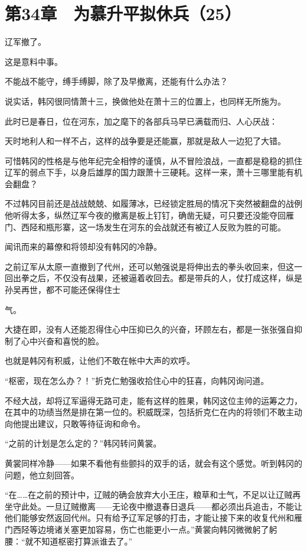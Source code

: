 \section{第34章　为慕升平拟休兵（25）}

辽军撤了。

这是意料中事。

不能战不能守，缚手缚脚，除了及早撤离，还能有什么办法？

说实话，韩冈很同情萧十三，换做他处在萧十三的位置上，也同样无所施为。

此时已是春日，位在河东，加之麾下的各部兵马早已满载而归、人心厌战：

天时地利人和一样不占，这样的战争要是还能赢，那就是敌人一边犯了大错。

可惜韩冈的性格是与他年纪完全相悖的谨慎，从不冒险浪战，一直都是稳稳的抓住辽军的弱点下手，以身后雄厚的国力跟萧十三硬耗。这样一来，萧十三哪里能有机会翻盘？

不过韩冈目前还是战战兢兢、如履薄冰，已经锁定胜局的情况下突然被翻盘的战例他听得太多，纵然辽军今夜的撤离是板上钉钉，确凿无疑，可只要还没能夺回雁门、西陉和瓶形寨，这一场发生在河东的会战就还有被辽人反败为胜的可能。

闻讯而来的幕僚和将领却没有韩冈的冷静。

之前辽军从太原一直撤到了代州，还可以勉强说是将伸出去的拳头收回来，但这一回出拳之后，不仅没有战果，还被逼着收回去。都是带兵的人，仗打成这样，纵是孙吴再世，都不可能还保得住士

气。

大捷在即，没有人还能忍得住心中压抑已久的兴奋，环顾左右，都是一张张强自抑制了心中兴奋和喜悦的脸。

也就是韩冈有积威，让他们不敢在帐中大声的欢呼。

“枢密，现在怎么办？！”折克仁勉强收拾住心中的狂喜，向韩冈询问道。

不经大战，却将辽军逼得无路可走，能有这样的胜果，韩冈这位主帅的运筹之力，在其中的功绩当然是排在第一位的。积威既深，包括折克仁在内的将领们不敢主动向他提出建议，只敢等待征询和命令。

“之前的计划是怎么定的？”韩冈转问黄裳。

黄裳同样冷静——如果不看他有些颤抖的双手的话，就会有这个感觉。听到韩冈的问题，他立刻回答。

“在……在之前的预计中，辽贼的确会放弃大小王庄，粮草和士气，不足以让辽贼再坐守此处。一旦辽贼撤离——无论夜中撤退春日退兵——都必须出兵追击，不能让他们能够安然返回代州。只有给予辽军足够的打击，才能让接下来的收复代州和雁门西陉等边境诸关塞更加容易，伤亡也能更小一点。”黄裳向韩冈微微躬了躬腰：“就不知道枢密打算派谁去了。”

